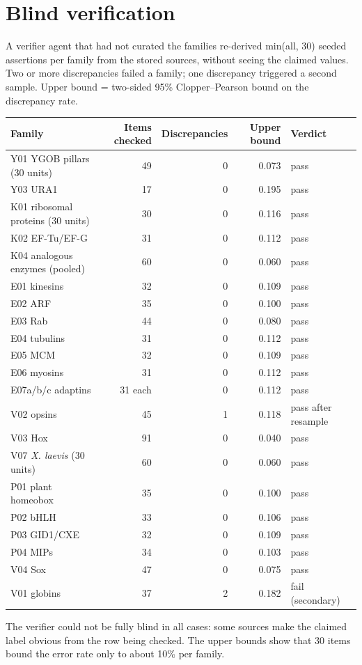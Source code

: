 \documentclass[10pt]{article}
\begin{document}
\section*{Blind verification}
A verifier agent that had not curated the families re-derived min(all, 30) seeded assertions per family from the stored
sources, without seeing the claimed values. Two or more discrepancies failed a family; one discrepancy triggered a
second sample. Upper bound = two-sided 95\% Clopper--Pearson bound on the discrepancy rate.

\begin{tabular}{lrrrl}
\toprule
Family & Items checked & Discrepancies & Upper bound & Verdict \\
\midrule
Y01 YGOB pillars (30 units) & 49 & 0 & 0.073 & pass \\
Y03 URA1 & 17 & 0 & 0.195 & pass \\
K01 ribosomal proteins (30 units) & 30 & 0 & 0.116 & pass \\
K02 EF-Tu/EF-G & 31 & 0 & 0.112 & pass \\
K04 analogous enzymes (pooled) & 60 & 0 & 0.060 & pass \\
E01 kinesins & 32 & 0 & 0.109 & pass \\
E02 ARF & 35 & 0 & 0.100 & pass \\
E03 Rab & 44 & 0 & 0.080 & pass \\
E04 tubulins & 31 & 0 & 0.112 & pass \\
E05 MCM & 32 & 0 & 0.109 & pass \\
E06 myosins & 31 & 0 & 0.112 & pass \\
E07a/b/c adaptins & 31 each & 0 & 0.112 & pass \\
V02 opsins & 45 & 1 & 0.118 & pass after resample \\
V03 Hox & 91 & 0 & 0.040 & pass \\
V07 \textit{X. laevis} (30 units) & 60 & 0 & 0.060 & pass \\
P01 plant homeobox & 35 & 0 & 0.100 & pass \\
P02 bHLH & 33 & 0 & 0.106 & pass \\
P03 GID1/CXE & 32 & 0 & 0.109 & pass \\
P04 MIPs & 34 & 0 & 0.103 & pass \\
V04 Sox & 47 & 0 & 0.075 & pass \\
V01 globins & 37 & 2 & 0.182 & fail (secondary) \\
\bottomrule
\end{tabular}

The verifier could not be fully blind in all cases: some sources make the claimed label obvious from the row being
checked. The upper bounds show that 30 items bound the error rate only to about 10\% per family.
\end{document}

